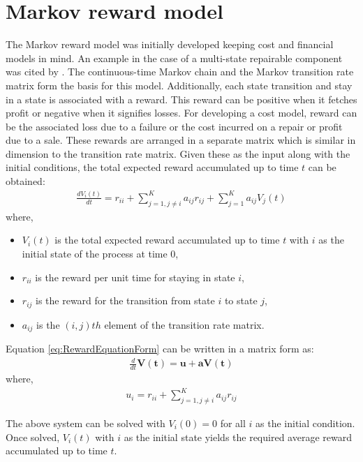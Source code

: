 \section{Markov reward model}
\label{sec:MarkovRewardModel}
The Markov reward model was initially developed keeping cost and financial models in mind. An example in the case of a multi-state repairable component was cited by \cite{Lisnianski2003}. The continuous-time Markov chain and the Markov transition rate matrix form the basis for this model. Additionally, each state transition and stay in a state is associated with a reward. This reward can be positive when it fetches profit or negative when it signifies losses. For developing a cost model, reward can be the associated loss due to a failure or the cost incurred on a repair or profit due to a sale. These rewards are arranged in a separate matrix which is similar in dimension to the transition rate matrix. Given these as the input along with the initial conditions, the total expected reward accumulated up to time $t$ can be obtained:
\begin{align}
\frac{dV_i(t)}{dt} = r_{ii} + \sum_{j=1, j \neq i}^{K}{a_{ij}r_{ij}} + \sum_{j=1}^{K}{a_{ij}V_j(t)}
\label{eq:RewardEquationForm}
\end{align}
where,
\begin{itemize}
\item $V_i(t)$ is the total expected reward accumulated up to time $t$ with $i$ as the initial state  of the process at time 0,
\item $r_{ii}$ is the reward per unit time for staying in state $i$,
\item $r_{ij}$ is the reward for the transition from state $i$ to state $j$,
\item $a_{ij}$ is the $(i,j)th$ element of the transition rate matrix.
\end{itemize}

Equation \ref{eq:RewardEquationForm} can be written in a matrix form as:
\begin{align}
\frac{d}{dt} \pmb{V(t) = u + aV(t)}
\label{eq:RewardMatrixForm}
\end{align}
where,
\begin{align}
u_i = r_{ii} + \sum_{j=1, j \neq i}^{K}{a_{ij}r_{ij}} 
\label{eq:UInRewardEqn}
\end{align}

The above system can be solved with $V_i(0)=0$ for all $i$ as the initial condition. Once solved, $V_i(t)$ with $i$ as the initial state yields the required average reward accumulated up to time $t$.


